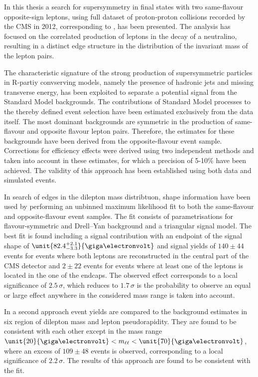 In this thesis a search for supersymmetry in final states with two same-flavour opposite-sign leptons, using full dataset of proton-proton collisions recorded by the CMS in 2012, corresponding to \lumi, has been presented. The analysis has focused on the correlated production of leptons in the decay of a neutralino, resulting in a distinct edge structure in the distribution of the invariant mass  of the lepton pairs. 

The characteristic signature of the strong production of supersymmetric particles in R-partiy convserving models, namely the presence of hadronic jets and missing transverse energy, has been exploited to separate a potential signal from the Standard Model backgrounds. The contributions of Standard Model processes to the thereby defined event selection have been estimated exclusively from the data itself. The most dominant backgrounds are symmetric in the production of same-flavour and opposite flavour lepton pairs. Therefore, the estimates for these backgrounds have been derived from the opposite-flavour event sample. Corrections for efficiency effects were derived using two independent methods and taken into account in these estimates, for which a precision of 5-10\% have been achieved.  The validity of this approach has been established using both data and simulated events. 

In search of edges in the dilepton mass distribtuon, shape information have been used by performing an unbinned maximum likelihood fit to both the same-flavour and opposite-flavour event samples. The fit consists of parametrisations for flavour-symmetric and Drell--Yan background and a triangular signal model. The best fit is found including a signal contribution with an endpoint of the signal shape of $\unit{82.4^{+2.1}_{-3.3}}{\giga\electronvolt}$ and signal yields of $140\pm44$ events for events where both leptons are reconstructed in the central part of the CMS detector and $2\pm22$ events for events where at least one of the leptons is located in the one of the endcaps. The observed effect corresponds to a local significance of $2.5\,\sigma$, which reduces to $1.7\,\sigma$ is the probability to observe an equal or large effect anywhere in the considered mass range is taken into account. 

In a second approach event yields are compared to the background estimates in six region of dilepton mass and lepton pseudorapidity. They are found to be consistent with each other except in the mass range $\unit{20}{\giga\electronvolt} < \mll < \unit{70}{\giga\electronvolt}$, where an excess of $109\pm48$ events is observed, corresponding to a local significance of $2.2\,\sigma$. The results of this approach are found to be consistent with the fit. 

